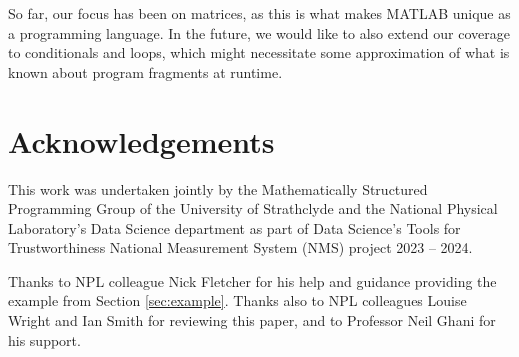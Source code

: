 \documentclass{IMEKO2024}
\begin{document}
So far, our focus has been on matrices, as this is what makes MATLAB
unique as a programming language.
%
In the future, we would like to also extend our coverage to
conditionals and loops, which might necessitate some approximation of
what is known about program fragments at runtime.

\section{Acknowledgements}

This work was undertaken jointly by the Mathematically Structured Programming Group of the University of Strathclyde and the National Physical Laboratory’s Data Science department as part of Data Science’s Tools for Trustworthiness National Measurement System (NMS) project 2023 – 2024.

Thanks to NPL colleague Nick Fletcher for his help and guidance providing the example from Section \ref{sec:example}. Thanks also to NPL colleagues Louise Wright and Ian Smith for reviewing this paper, and to Professor Neil Ghani for his support.



\end{document}
